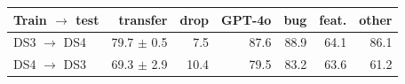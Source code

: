 \begin{tabular}{@{}lrrrrrr@{}}
\toprule
Train $\rightarrow$ test & transfer & drop & GPT-4o & bug & feat. & other \\
\midrule
DS3 $\rightarrow$ DS4 & 79.7 $\pm$ 0.5 & 7.5 & 87.6 & 88.9 & 64.1 & 86.1 \\
DS4 $\rightarrow$ DS3 & 69.3 $\pm$ 2.9 & 10.4 & 79.5 & 83.2 & 63.6 & 61.2 \\
\bottomrule
\end{tabular}
